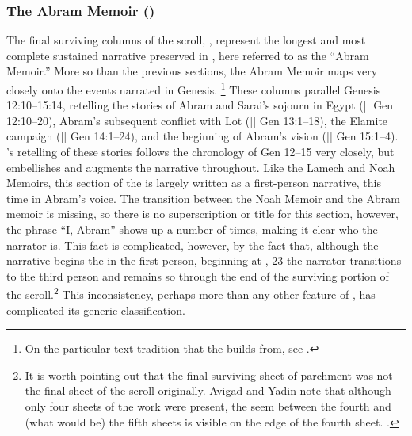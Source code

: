 \subsubsection{The Abram Memoir ()}

The final surviving columns of the scroll, , represent the longest and most complete sustained narrative preserved in \ga, here referred to as the ``Abram Memoir.'' More so than the previous sections, the Abram Memoir maps very closely onto the events narrated in Genesis.%
%
\footnote{On the particular text tradition that the \ga builds from, see \cite{vanderkam1978}.}%
%
These columns parallel Genesis 12:10--15:14, retelling the stories of Abram and Sarai's sojourn in Egypt (|| Gen 12:10--20), Abram's subsequent conflict with Lot (|| Gen 13:1--18), the Elamite campaign (|| Gen 14:1--24), and the beginning of Abram's vision (|| Gen 15:1--4). \ga's retelling of these stories follows the chronology of Gen 12--15 very closely, but embellishes and augments the narrative throughout. Like the Lamech and Noah Memoirs, this section of the \ga is largely written as a first-person narrative, this time in Abram's voice. The transition between the Noah Memoir and the Abram memoir is missing, so there is no superscription or title for this section, however, the phrase ``I, Abram'' shows up a number of times, making it clear who the narrator is. This fact is complicated, however, by the fact that, although the narrative begins the in the first-person, beginning at , 23 the narrator transitions to the third person and remains so through the end of the surviving portion of the scroll.\footnote{It is worth pointing out that the final surviving sheet of parchment was not the final sheet of the scroll originally. Avigad and Yadin note that although only four sheets of the work were present, the seem between the fourth and (what would be) the fifth sheets is visible on the edge of the fourth sheet. \cite*[14]{avigad-yadin1956}.} This inconsistency, perhaps more than any other feature of \ga, has complicated its generic classification.

